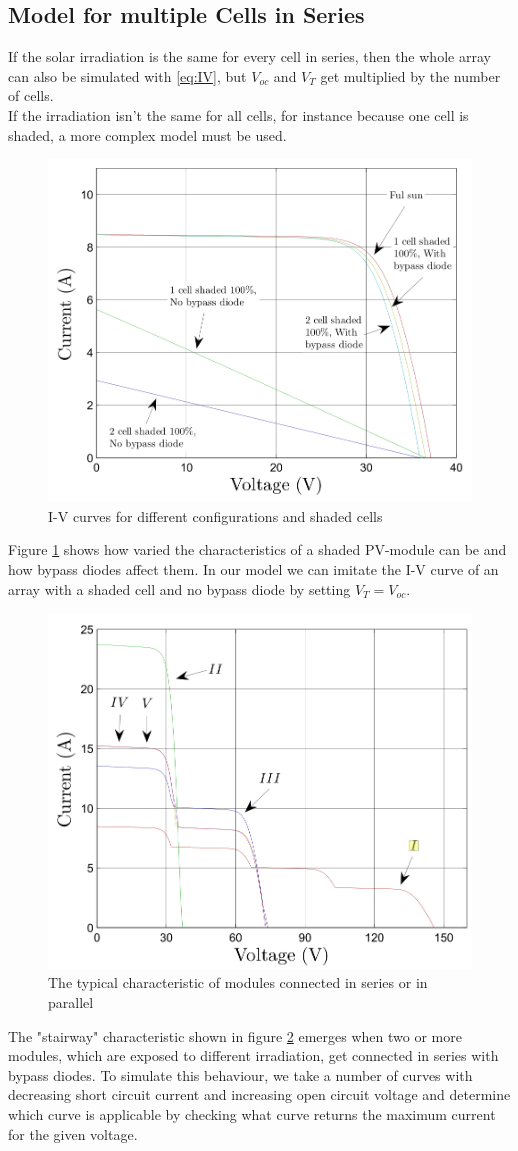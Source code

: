 \subsection{Model for multiple Cells in Series}
If the solar irradiation is the same for every cell in series, then the whole array can also be simulated with \eqref{eq:IV}, but $V_{oc}$ and $V_T$ get multiplied by the number of cells.\\
If the irradiation isn't the same for all cells, for instance because one cell is shaded, a more complex model must be used.
\begin{figure}[h]
	\center
    \includegraphics[width=.5\textwidth]{images/model/shaded.png}
    \caption{I-V curves for different configurations and shaded cells\cite{ref:tian:model}}
    \label{fig:model:shaded}
\end{figure}
Figure \ref{fig:model:shaded} shows how varied the characteristics of a shaded PV-module can be and how bypass diodes affect them. In our model we can imitate the I-V curve of an array with a shaded cell and no bypass diode by setting $V_T = V_{oc}$. \\
\begin{figure}[h]
	\center
    \includegraphics[width=.5\textwidth]{images/model/steps.png}
    \caption{The typical characteristic of modules connected in series or in parallel}
    \label{fig:model:steps}
\end{figure}
The "stairway"  characteristic shown in figure \ref{fig:model:steps} emerges when two or more modules, which are exposed to different irradiation, get connected in series with bypass diodes. To simulate this behaviour, we take a number of curves with decreasing short circuit current and increasing open circuit voltage and determine which curve is applicable by checking what curve returns the maximum current for the given voltage.  